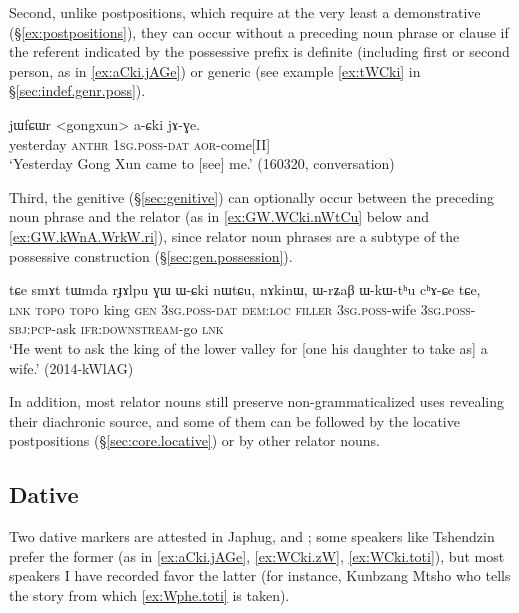 Second, unlike postpositions, which require at the very least a demonstrative (§\ref{ex:postpositions}), they can occur without a preceding noun phrase or clause if the referent indicated by the possessive prefix is definite (including first or second person, as in \ref{ex:aCki.jAGe}) or generic (see example \ref{ex:tWCki} in §\ref{sec:indef.genr.poss}). 

\begin{exe}
\ex \label{ex:aCki.jAGe}
\gll jɯfɕɯr <gongxun> a-ɕki jɤ-ɣe. \\
yesterday  \textsc{anthr} \textsc{1sg}.\textsc{poss}-\textsc{dat} \textsc{aor}-come[II] \\
\glt `Yesterday Gong Xun came to [see] me.' (160320, conversation)
\end{exe}

Third, the genitive  (§\ref{sec:genitive}) can optionally occur between the preceding noun phrase and the relator (as in \ref{ex:GW.WCki.nWtCu} below and \ref{ex:GW.kWnA.WrkW.ri}), since relator noun phrases are a subtype of the possessive construction (§\ref{sec:gen.possession}).

\begin{exe}
\ex \label{ex:GW.WCki.nWtCu}
\gll tɕe smɤt tɯmda rɟɤlpu ɣɯ ɯ-ɕki nɯtɕu, nɤkinɯ, ɯ-rʑaβ ɯ-kɯ-tʰu cʰɤ-ɕe tɕe, \\
\textsc{lnk}  \textsc{topo} \textsc{topo} king \textsc{gen} \textsc{3sg}.\textsc{poss}-\textsc{dat} \textsc{dem}:\textsc{loc} \textsc{filler} \textsc{3sg}.\textsc{poss}-wife \textsc{3sg}.\textsc{poss}-\textsc{sbj}:\textsc{pcp}-ask \textsc{ifr}:\textsc{downstream}-go \textsc{lnk} \\
\glt `He went to ask the king of the lower valley for [one his daughter to take as] a wife.' (2014-kWlAG)
\end{exe}

In addition, most relator nouns still preserve non-grammaticalized uses revealing their diachronic source, and some of them can be followed by the locative postpositions (§\ref{sec:core.locative}) or by other relator nouns.

\subsection{Dative} \label{sec:dative} 
Two dative markers are attested in Japhug,  and ; some speakers like Tshendzin prefer the former (as in \ref{ex:aCki.jAGe}, \ref{ex:WCki.zW}, \ref{ex:WCki.toti}), but most speakers I have recorded favor the latter (for instance, Kunbzang Mtsho who tells the story from which \ref{ex:Wphe.toti} is taken).

